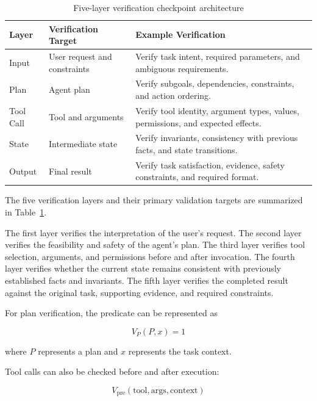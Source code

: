 \documentclass[12pt]{article}
\begin{document}
\begin{table}[htbp]
\centering
\caption{Five-layer verification checkpoint architecture}
\label{tab:checkpoint-layers}
\begin{tabular}{p{} p{} p{}}
\toprule
\textbf{Layer} & \textbf{Verification Target} & \textbf{Example Verification} \\
\midrule
Input & User request and constraints & Verify task intent, required parameters, and ambiguous requirements. \\
Plan & Agent plan & Verify subgoals, dependencies, constraints, and action ordering. \\
Tool Call & Tool and arguments & Verify tool identity, argument types, values, permissions, and expected effects. \\
State & Intermediate state & Verify invariants, consistency with previous facts, and state transitions. \\
Output & Final result & Verify task satisfaction, evidence, safety constraints, and required format. \\
\bottomrule
\end{tabular}
\end{table}

The five verification layers and their primary validation targets are
summarized in Table~\ref{tab:checkpoint-layers}.

The first layer verifies the interpretation of the user's request. The second
layer verifies the feasibility and safety of the agent's plan. The third layer
verifies tool selection, arguments, and permissions before and after invocation.
The fourth layer verifies whether the current state remains consistent with
previously established facts and invariants. The fifth layer verifies the
completed result against the original task, supporting evidence, and required
constraints.

For plan verification, the predicate can be represented as

\begin{equation}
V_P(P,x)=1
\label{eq:plan-verification}
\end{equation}

where $P$ represents a plan and $x$ represents the task context.

Tool calls can also be checked before and after execution:

\begin{equation}
V_{\mathrm{pre}}(\text{tool},\text{args},\text{context})
\label{eq:pre-verification}
\end{equation}
\end{document}
